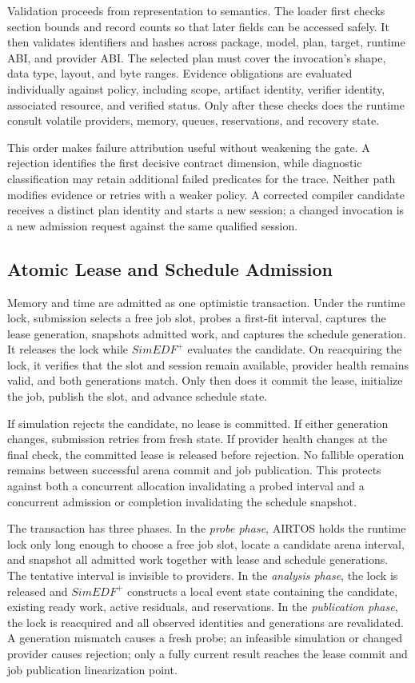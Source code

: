 \documentclass[lettersize,journal]{IEEEtran}
\begin{document}
Validation proceeds from representation to semantics. The loader first checks
section bounds and record counts so that later fields can be accessed safely.
It then validates identifiers and hashes across package, model, plan, target,
runtime ABI, and provider ABI. The selected plan must cover the invocation's
shape, data type, layout, and byte ranges. Evidence obligations are evaluated
individually against policy, including scope, artifact identity, verifier
identity, associated resource, and verified status. Only after these checks
does the runtime consult volatile providers, memory, queues, reservations, and
recovery state.

This order makes failure attribution useful without weakening the gate. A
rejection identifies the first decisive contract dimension, while diagnostic
classification may retain additional failed predicates for the trace. Neither
path modifies evidence or retries with a weaker policy. A corrected compiler
candidate receives a distinct plan identity and starts a new session; a
changed invocation is a new admission request against the same qualified
session.

\subsection{Atomic Lease and Schedule Admission}
Memory and time are admitted as one optimistic transaction. Under the runtime
lock, submission selects a free job slot, probes a first-fit interval, captures
the lease generation, snapshots admitted work, and captures the schedule
generation. It releases the lock while $SimEDF^+$ evaluates the candidate. On
reacquiring the lock, it verifies that the slot and session remain available,
provider health remains valid, and both generations match. Only then does it
commit the lease, initialize the job, publish the slot, and advance schedule
state.

If simulation rejects the candidate, no lease is committed. If either
generation changes, submission retries from fresh state. If provider health
changes at the final check, the committed lease is released before rejection.
No fallible operation remains between successful arena commit and job
publication. This protects against both a concurrent allocation invalidating a
probed interval and a concurrent admission or completion invalidating the
schedule snapshot.

The transaction has three phases. In the \emph{probe phase}, AIRTOS holds the
runtime lock only long enough to choose a free job slot, locate a candidate
arena interval, and snapshot all admitted work together with lease and schedule
generations. The tentative interval is invisible to providers. In the
\emph{analysis phase}, the lock is released and $SimEDF^+$ constructs a local
event state containing the candidate, existing ready work, active residuals,
and reservations. In the \emph{publication phase}, the lock is reacquired and
all observed identities and generations are revalidated. A generation mismatch
causes a fresh probe; an infeasible simulation or changed provider causes
rejection; only a fully current result reaches the lease commit and job
publication linearization point.
\end{document}
